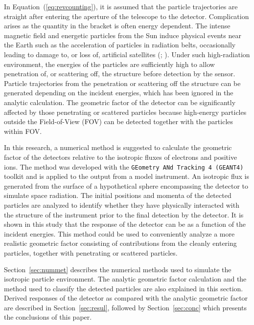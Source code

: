 \documentclass{jkas}
\begin{document}
In Equation~(\ref{eq:revcounting}), it is assumed that the particle trajectories are straight after entering the aperture of the telescope to the detector. Complication arises as the quantity in the bracket is often energy dependent. The intense magnetic field and energetic particles from the Sun induce physical events near the Earth such as the acceleration of particles in radiation belts, occasionally leading to damage to, or loss of, artificial satellites (\citealt{lanzerotti2001}; \citealt{baker2002}). Under such high-radiation environment, the energies of the particles are sufficiently high to allow penetration of, or scattering off, the structure before detection by the sensor. Particle trajectories from the penetration or scattering off the structure can be generated depending on the incident energies, which has been ignored in the analytic calculation. The geometric factor of the detector can be significantly affected by those penetrating or scattered particles because high-energy particles outside the Field-of-View (FOV) can be detected together with the particles within FOV.

In this research, a numerical method is suggested to calculate the geometric factor of the detectors relative to the isotropic fluxes of electrons and positive ions. The method was developed with the {\tt GEometry ANd Tracking 4 (GEANT4)} toolkit and is applied to the output from a model instrument. An isotropic flux is generated from the surface of a hypothetical sphere encompassing the detector to simulate space radiation. The initial positions and momenta of the detected particles are analyzed to identify whether they have physically interacted with the structure of the instrument prior to the final detection by the detector. It is shown in this study that the response of the detector can be as a function of the incident energies. This method could be used to conveniently analyze a more realistic geometric factor consisting of contributions from the cleanly entering particles, together with penetrating or scattered particles.

Section~\ref{sec:nummet} describes the numerical methods used to simulate the isotropic particle environment. The analytic geometric factor calculation and the method used to classify the detected particles are also explained in this section. Derived responses of the detector as compared with the analytic geometric factor are described in Section~\ref{sec:resul}, followed by Section~\ref{sec:conc} which presents the conclusions of this paper.
\end{document}
